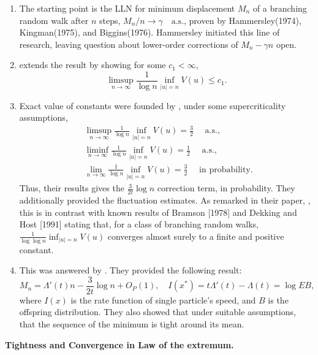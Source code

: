\begin{enumerate}
\item The starting point is the LLN for minimum displacement $M_n$ of a branching random walk after $n$ steps, $M_n / n \to \gamma \quad \text{a.s.}$, proven by Hammersley(1974), Kingman(1975), and Biggins(1976). Hammersley initiated this line of research, leaving question about lower-order corrections of $M_n - \gamma n$ open. 

\item \autocite{mcdiarmidMinimalPositions1995} extends the result by showing for some $c_1 < \infty$, 
\[
\limsup _{n \rightarrow \infty} \frac{1}{\log n} \inf _{|u|=n} V(u) \leq c_1.
\]

\item Exact value of constants were founded by \autocite[Theorem~1.2]{hushiMinimalPosition2009}, under some supercriticality assumptions,
\[
\begin{aligned}
& \limsup _{n \rightarrow \infty} \frac{1}{\log n} \inf _{|u|=n} V(u)=\frac{3}{2} \quad \text { a.s., } \\
& \liminf _{n \rightarrow \infty} \frac{1}{\log n} \inf _{|u|=n} V(u)=\frac{1}{2} \quad \text { a.s., } \\
& \lim _{n \rightarrow \infty} \frac{1}{\log n} \inf _{|u|=n} V(u)=\frac{3}{2} \quad \text { in probability. }
\end{aligned}
\]
Thus, their results gives the $\frac{3}{2t} \log n$ correction term, in probability. They additionally provided the fluctuation estimates. As remarked in their paper, \autocite[p.~744]{hushiMinimalPosition2009}, this is in contrast with known results of Bramson [1978] and Dekking and Host [1991] stating that, for a class of branching random walks, $\frac{1}{\log \log n} \inf _{|u|=n} V(u)$ converges almost surely to a finite and positive constant. 

\item  This was answered by \autocite{addario-berryMinimaBranching2009}. They provided the following result:
\[
M_n=\Lambda'(t) n-\frac{3}{2t}  \log n+O_P(1), \quad I(x^*) = t \Lambda'(t) - \Lambda(t) = \log E B,
\]
where $I(x)$ is the rate function of single particle's speed, and $B$ is the offspring distribution. They also showed that under suitable assumptions, that
the sequence of the minimum is tight around its mean. 
\end{enumerate}

\textbf{Tightness and Convergence in Law of the extremum.} 

